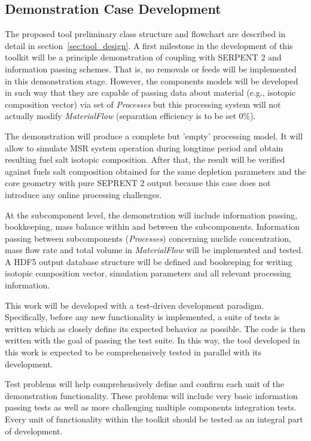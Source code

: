 \subsection{Demonstration Case Development}
The proposed tool preliminary class structure and flowchart are 
described in detail in section~\ref{sec:tool_design}.
A first milestone in the development of this toolkit will be a 
principle demonstration of coupling with SERPENT 2 and 
information passing schemes. That is, no removals or feeds 
will be implemented in this demonstration stage. However, 
the components models will be developed in such way that 
they are capable of passing data about material (e.g., isotopic 
composition vector) via set of \textit{Processes} but this 
processing system will not actually modify \textit{MaterialFlow} 
(separation efficiency is to be set 0\%).

The demonstration will produce a complete but 'empty' processing 
model. It will allow to simulate \gls{MSR} system operation during 
longtime period and obtain resulting fuel salt isotopic composition. 
After that, the result will be verified against fuels salt 
composition obtained for the same depletion parameters and the 
core geometry with pure SEPRENT 2 output because this case does not 
introduce any online processing challenges.

At the subcomponent level, the demonstration will include information 
passing, bookkeeping, mass balance within and between the 
subcomponents. Information passing between subcomponents 
(\textit{Processes}) concerning nuclide concentration, mass flow rate 
and total volume in \textit{MaterialFlow} will be implemented and tested. 
A HDF5 output database structure will be defined and 
bookeeping for writing isotopic composition vector, simulation 
parameters and all relevant processing information.

This work will be developed with a test-driven development paradigm. 
Specifically, before any new functionality is implemented, a suite of 
tests is written which as closely define its expected behavior as 
possible. The code is then written with the goal of passing the test 
suite. In this way, the tool developed in this work is expected to be
comprehensively tested in parallel with its development.

Test problems will help comprehensively define and confirm each unit 
of the demonstration functionality. These problems will include very 
basic information passing tests as well as more challenging multiple 
components integration tests. Every unit of functionality
within the toolkit should be tested as an integral part of development.

